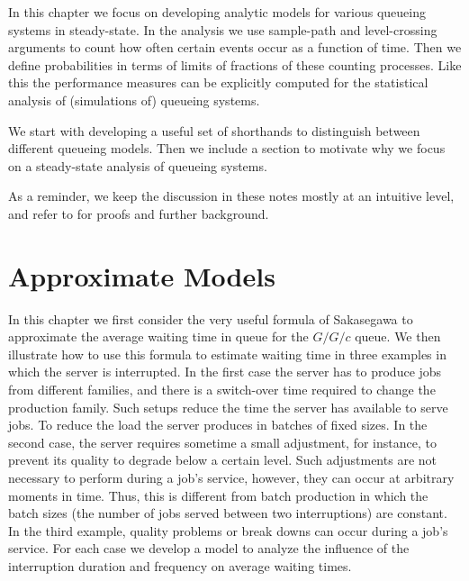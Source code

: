 In this chapter we focus on developing analytic models for various queueing systems in steady-state.
In the analysis we use sample-path and level-crossing arguments to count how often certain events occur as a function of time.
Then we define probabilities in terms of limits of fractions of these counting processes.
Like this the performance measures can be explicitly computed for the statistical analysis of (simulations of) queueing systems.

We start with developing a useful set of shorthands to distinguish between different queueing models. Then we include a section to motivate why we focus on a steady-state analysis of queueing systems. 

As a reminder, we keep the discussion in these notes mostly at an intuitive level, and refer to \cite{el-taha98:_sampl_path_analy_queuein_system} for proofs and further background.
















% 
%


\chapter{Approximate Models}
\label{cha:approximate-models}
In this chapter we first consider the very useful formula of Sakasegawa to approximate the average waiting time in queue for the $G/G/c$ queue.
We then illustrate how to use this formula to estimate waiting time in three examples in which the server is interrupted.
In the first case the server has to produce jobs from different families, and there is a switch-over time required to change the production family.
Such setups reduce the time the server has available to serve jobs.
To reduce the load the server produces in batches of fixed sizes.
In the second case, the server requires sometime a small adjustment, for instance, to prevent its quality to degrade below a certain level.
Such adjustments are not necessary to perform during a job's service, however, they can occur at arbitrary moments in time.
Thus, this is different from batch production in which the batch sizes (the number of jobs served between two interruptions) are constant.
In the third example, quality problems or break downs can occur during a job's service.
For each case we develop a model to analyze the influence of the interruption duration and frequency on average waiting times. 

